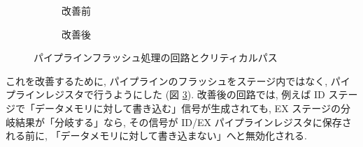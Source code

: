 \documentclass[../improvements.tex]{subfiles}
\begin{document}
  \begin{figure}
    \centering
    \begin{subfigure}{\columnwidth}
      \centering
      \caption{改善前}
      \label{fig:critical-path-before}
    \end{subfigure}
    \begin{subfigure}{\columnwidth}
      \centering
      \caption{改善後}
      \label{fig:critical-path-after}
    \end{subfigure}
    \caption{パイプラインフラッシュ処理の回路とクリティカルパス}
  \end{figure}

  これを改善するために, パイプラインのフラッシュをステージ内ではなく, 
  パイプラインレジスタで行うようにした (図 \ref{fig:critical-path-after}).
  改善後の回路では, 例えば ID ステージで「データメモリに対して書き込む」信号が生成されても, 
  EX ステージの分岐結果が「分岐する」なら, 
  その信号が ID/EX パイプラインレジスタに保存される前に, 「データメモリに対して書き込まない」へと無効化される.
\end{document}
